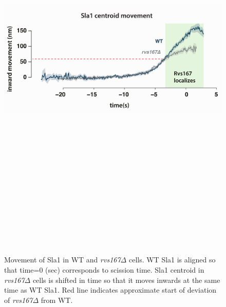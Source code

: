 	\begin{figure}[H]
		\centering
		\hspace{-1cm}
		\includegraphics[width=15cm,height=20cm, keepaspectratio]{figures/results_final/rvsdeletion3}
		\caption[Coat movement in \textit{rvs167$\Delta$} cells]
		{Movement of Sla1 in WT and  \textit{rvs167$\Delta$} cells. WT Sla1 is aligned so that time=0 (sec) corresponds to scission time. Sla1 centroid  in \textit{rvs167$\Delta$} cells is shifted in time so that it moves inwards at the same time as WT Sla1. Red line indicates approximate start of deviation of \textit{rvs167$\Delta$} from WT. 
			\label{fig2_rvsdelta}
		}
	\end{figure}





